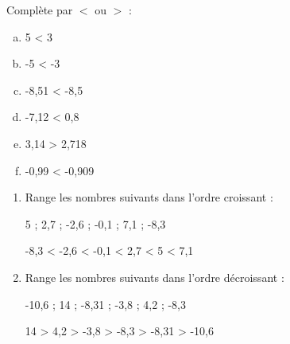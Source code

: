 \documentclass[a4paper,11pt]{article}
\begin{document}
\begin{question}[(3 points)]
	Complète par $<$ ou $>$ :

	\begin{multicols}{3}
		\begin{enumerate}[a)]
			\item 5 {\color{red} <} 3
			\item -5 {\color{red} <} -3
			\item -8,51 {\color{red} <} -8,5
			\item -7,12 {\color{red} <} 0,8
			\item 3,14 {\color{red} >} 2,718
			\item -0,99 {\color{red} <} -0,909
		\end{enumerate}
	\end{multicols}
\end{question}

\begin{question}[(2 points)]
	\begin{enumerate}[1)]
		\item Range les nombres suivants dans l'ordre croissant :

		      5 ; 2,7 ; -2,6 ; -0,1 ; 7,1 ; -8,3

		      {\color{red} -8,3 < -2,6 < -0,1 < 2,7 < 5 < 7,1}
		\item Range les nombres suivants dans l'ordre décroissant :

		      -10,6 ; 14 ; -8,31 ; -3,8 ; 4,2 ; -8,3

		      {\color{red} 14 > 4,2 > -3,8 > -8,3 > -8,31 > -10,6}
	\end{enumerate}
\end{question}
\end{document}
